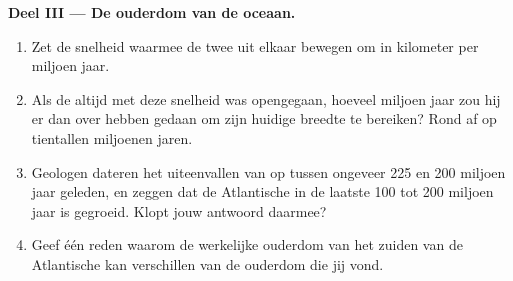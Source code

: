 \begin{problem}
\medskip
\noindent\textbf{Deel III --- De ouderdom van de oceaan.}
\begin{enumerate}[resume]
  \item Zet de snelheid waarmee de twee  uit elkaar bewegen om in
        kilometer per miljoen jaar.
  \item Als de  altijd met deze snelheid was opengegaan, hoeveel
        miljoen jaar zou hij er dan over hebben gedaan om zijn huidige
        breedte te bereiken? Rond af op tientallen miljoenen jaren.
  \item Geologen dateren het uiteenvallen van  op tussen ongeveer 225
        en 200 miljoen jaar geleden, en zeggen dat de Atlantische  in
        de laatste 100 tot 200 miljoen jaar is gegroeid. Klopt jouw
        antwoord daarmee?
  \item Geef één reden waarom de werkelijke ouderdom van het zuiden van de
        Atlantische  kan verschillen van de ouderdom die jij vond.
\end{enumerate}
\end{problem}
